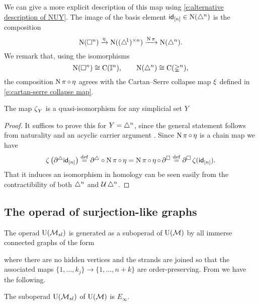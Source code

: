 We can give a more explicit description of this map using \eqref{e:alternative description of NUY}.
The image of the basis element $\mathsf{id}_{[n]} \in \operatorname{N}(\triangle^n)$ is the composition
\[
\operatorname{N}(\square^n) \xrightarrow{\operatorname{\eta}} \operatorname{N}((\triangle^{\!1})^{\times n}) \xrightarrow{\operatorname{N} \operatorname{\pi}} \operatorname{N}(\triangle^n).
\]
We remark that, using the isomorphisms
\[
\operatorname{N}(\square^n) \cong \operatorname{C}(\mathbb{I}^n), \qquad
\operatorname{N}(\triangle^n) \cong \operatorname{C}(\mathbb{\Delta}^n),
\]
the composition $\operatorname{N} \operatorname{\pi} \circ \operatorname{\eta}$ agrees with the Cartan--Serre collapse map $\operatorname{\xi}$ defined in \eqref{e:cartan-serre collapse map}.

\begin{lemma}
	The map $\operatorname{\zeta}_Y$ is a quasi-isomorphism for any simplicial set $Y$
\end{lemma}

\begin{proof}
	It suffices to prove this for $Y = \triangle^n$, since the general statement follows from naturality and an acyclic carrier argument \cite{eilenberg1953acyclic}.
	Since $\operatorname{N} \operatorname{\pi} \circ \operatorname{\eta}$ is a chain map we have
	\begin{align*}
	\operatorname{\zeta} \big( \partial^\triangle \mathsf{id}_{[n]} \big) \stackrel{\mathrm{def}}{=}
	\partial^\triangle \circ \operatorname{N} \operatorname{\pi} \circ \operatorname{\eta} =
	\operatorname{N} \operatorname{\pi} \circ \operatorname{\eta} \circ \, \partial^\square \stackrel{\mathrm{def}}{=}
	\partial^\square \operatorname{\zeta} (\mathsf{id}_{[n]}).
	\end{align*}
	That it induces an isomorphism in homology can be seen easily from the contractibility of both $\triangle^n$ and $\operatorname{\mathcal{U}} \triangle^n$.
\end{proof}

\subsection{The operad of surjection-like graphs} \label{ss:surjection-like graphs}

The operad ${\operatorname{U}(\mathcal{M}_{sl})}$ is generated as a suboperad of ${\operatorname{U}(\mathcal{M})}$ by all immerse connected graphs of the form

where there are no hidden vertices and the strands are joined so that the associated maps $\{1, \dots, k_j\} \to \{1, \dots, n+k\}$ are order-preserving.
From \cite{medina2021cubical} we have the following.

\begin{proposition} \label{p:simplicialandcubical}
	The suboperad ${\operatorname{U}(\mathcal{M}_{sl})}$ of ${\operatorname{U}(\mathcal{M})}$ is $E_\infty$.
\end{proposition}

